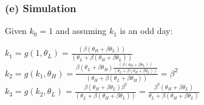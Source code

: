 \documentclass[10pt, a4paper]{article}
\begin{document}
    \subsubsection*{(e) Simulation}
    Given $k_0 = 1$ and assuming $k_1$ is an odd day: 
    \begin{center}
      $k_1 = g(1, \theta_L) = \frac{(\beta(\theta_H+\beta\theta_L))}{(\theta_L+\beta(\theta_H+\beta\theta_L))}$ \\
      $k_2 = g(k_1,\theta_H) = \frac{\beta(\theta_L+\beta\theta_H)\frac{(\beta(\theta_H+\beta\theta_L))}{(\theta_L+\beta(\theta_H+\beta\theta_L))}}{(\theta_H+\beta(\theta_L+\beta\theta_H))} = \beta^2$ \\
      $k_3 = g(k_2, \theta_L) = \frac{\beta(\theta_H+\beta\theta_L)\beta^2}{(\theta_L+\beta(\theta_H+\beta\theta_L))} = \frac{\beta^3(\theta_H+\beta\theta_L)}{\theta_L+\beta(\theta_H+\beta\theta_L)}$
    \end{center}
    
\end{document}
